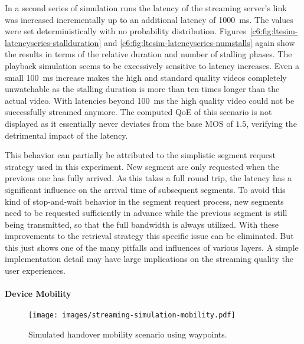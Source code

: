 In a second series of simulation runs the latency of the streaming server's link was increased incrementally up to an additional latency of \SI{1000}{\milli\second}. 
The values were set deterministically with no probability distribution. Figures~\ref{c6:fig:ltesim-latencyseries-stallduration} and \ref{c6:fig:ltesim-latencyseries-numstalls} again show the results in terms of the relative duration and number of stalling phases. The playback simulation seems to be excessively sensitive to latency increases. Even a small \SI{100}{\milli\second} increase makes the high and standard quality videos completely unwatchable as the stalling duration is more than ten times longer than the actual video. With latencies beyond \SI{100}{\milli\second} the high quality video could not be successfully streamed anymore. The computed \gls{QoE} of this scenario is not displayed as it essentially never deviates from the base \gls{MOS} of $1.5$, verifying the detrimental impact of the latency.

This behavior can partially be attributed to the simplistic segment request strategy used in this experiment. New segment are only requested when the previous one has fully arrived. As this takes a full round trip, the latency has a significant influence on the arrival time of subsequent segments. To avoid this kind of stop-and-wait behavior in the segment request process, new segments need to be requested sufficiently in advance while the previous segment is still being transmitted, so that the full bandwidth is always utilized. With these improvements to the retrieval strategy this specific issue can be eliminated. But this just shows one of the many pitfalls and influences of various layers. A simple implementation detail may have large implications on the streaming quality the user experiences.


\paragraph{Device Mobility}
\label{c6:sec:mobilitystreamingsim}

\begin{figure}[htb]
	\centering
	\texttt{[image: images/streaming-simulation-mobility.pdf]}
	\caption{Simulated handover mobility scenario using waypoints.}
\label{c6:fig:streaming-simulation-mobility}
\end{figure}

